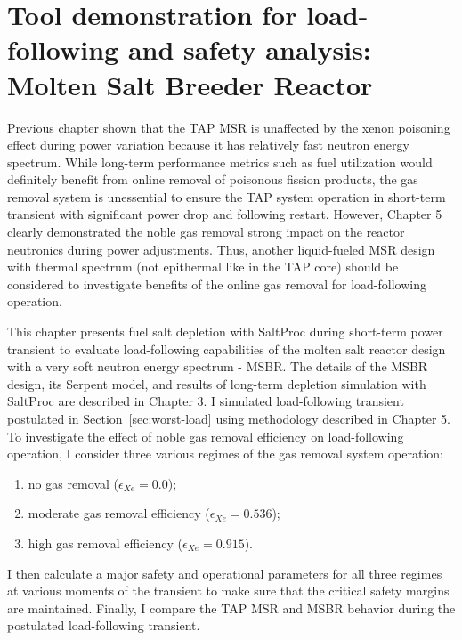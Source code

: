 \chapter{Tool demonstration for load-following and safety analysis: Molten 
Salt Breeder Reactor}
Previous chapter shown that the \gls{TAP} \gls{MSR} is unaffected by the xenon 
poisoning effect during power variation because it has relatively fast neutron 
energy spectrum. 
While long-term performance 
metrics such as fuel utilization would definitely benefit from online removal 
of poisonous fission products, the gas removal system is unessential to ensure 
the \gls{TAP} system operation in short-term transient with significant power 
drop and following restart. However, Chapter 5 clearly demonstrated the noble 
gas removal strong impact on the reactor neutronics during power adjustments. 
Thus, another liquid-fueled \gls{MSR} design with thermal spectrum (not 
epithermal like in the \gls{TAP} core) should be considered to investigate 
benefits of the online gas removal for load-following operation.	

This chapter presents fuel salt depletion with SaltProc during short-term 
power transient to evaluate load-following capabilities of the molten salt 
reactor design with a very soft neutron energy spectrum - \gls{MSBR}. The 
details of the \gls{MSBR} design, its Serpent model, and results of long-term 
depletion simulation with SaltProc are described in Chapter 3. I simulated 
load-following transient postulated in Section~\ref{sec:worst-load} using 
methodology described in Chapter 5. To investigate the effect of
noble gas 
removal efficiency on load-following operation, I consider three various 
regimes of the gas removal system operation:
\begin{enumerate}[label=(\alph*), noitemsep, topsep=0pt]
	\item no gas removal ($\epsilon_{Xe}=0.0$);
	\item moderate gas removal efficiency ($\epsilon_{Xe}=0.536$);
	\item high gas removal efficiency ($\epsilon_{Xe}=0.915$).
\end{enumerate}
I then calculate a major safety and operational parameters for all three 
regimes at various moments of the transient to make sure that the critical 
safety margins are maintained. Finally, I compare the \gls{TAP} \gls{MSR} and 
\gls{MSBR} behavior during the postulated load-following transient.


